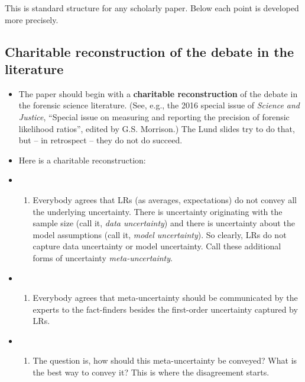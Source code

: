 \documentclass[
  10pt,
  dvipsnames,enabledeprecatedfontcommands]{scrartcl}
\providecommand{\tightlist}{%
  \setlength{\itemsep}{0pt}\setlength{\parskip}{0pt}}
\begin{document}
This is standard structure for any scholarly paper. Below each point is
developed more precisely.

\hypertarget{charitable-reconstruction-of-the-debate-in-the-literature}{%
\subsection{Charitable reconstruction of the debate in the
literature}\label{charitable-reconstruction-of-the-debate-in-the-literature}}

\begin{itemize}
\item
  The paper should begin with a \textbf{charitable reconstruction} of
  the debate in the forensic science literature. (See, e.g., the 2016
  special issue of \emph{Science and Justice}, ``Special issue on
  measuring and reporting the precision of forensic likelihood ratios'',
  edited by G.S. Morrison.) The Lund slides try to do that, but -- in
  retrospect -- they do not do succeed.
\item
  Here is a charitable reconstruction:
\item
  \begin{enumerate}
  \def\labelenumi{(\roman{enumi})}
  \tightlist
  \item
    Everybody agrees that LRs (as averages, expectations) do not convey
    all the underlying uncertainty. There is uncertainty originating
    with the sample size (call it, \emph{data uncertainty}) and there is
    uncertainty about the model assumptions (call it, \emph{model
    uncertainty}). So clearly, LRs do not capture data uncertainty or
    model uncertainty. Call these additional forms of uncertainty
    \emph{meta-uncertainty}.
  \end{enumerate}
\item
  \begin{enumerate}
  \def\labelenumi{(\roman{enumi})}
  \setcounter{enumi}{1}
  \tightlist
  \item
    Everybody agrees that meta-uncertainty should be communicated by the
    experts to the fact-finders besides the first-order uncertainty
    captured by LRs.
  \end{enumerate}
\item
  \begin{enumerate}
  \def\labelenumi{(\roman{enumi})}
  \setcounter{enumi}{2}
  \tightlist
  \item
    The question is, how should this meta-uncertainty be conveyed? What
    is the best way to convey it? This is where the disagreement starts.

\end{enumerate}
\end{itemize}
\end{document}
